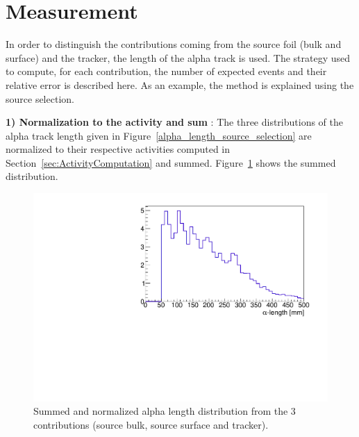 \documentclass[main.tex]{subfiles}
\begin{document}

\section{Measurement}\label{sec:MeasurementStategy}

\noindent In order to distinguish the contributions coming from the source foil (bulk and surface) and the tracker, the length of the alpha track is used. The strategy used to compute, for each contribution, the number of expected events and their relative error is described here. As an example, the method is explained using the source selection.


\bigskip


\noindent \textbf{1) Normalization to the activity and sum} : The three distributions of the alpha track length given in Figure~\ref{alpha_length_source_selection} are normalized to their respective activities computed in Section~\ref{sec:ActivityComputation} and summed. Figure~\ref{ref_distribution} shows the summed distribution.


\begin{figure}[h!]
\begin{center}
\includegraphics[scale=0.55]{pictures/Chap5/basic_distribution_alpha_length.pdf}
\caption{Summed and normalized alpha length distribution from the 3 contributions (source bulk, source surface and tracker).}
\label{ref_distribution}
\end{center}
\end{figure}
\end{document}
